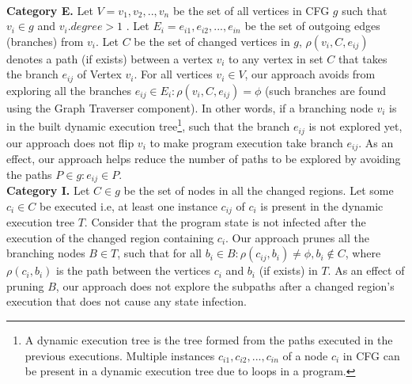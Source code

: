 \\ \textbf{Category E. }Let $V={v_1,v_2,..,v_n}$ be the set of all vertices in CFG $g$ such that $ v_i \in g$ and $v_i.degree >1$ . Let $E_i = {e_{i1}, e_{i2},...,e_{in}}$ be the set of outgoing edges (branches) from $v_i$. Let $C$ be the set of changed vertices in $g$, $\rho(v_i, C, e_{ij})$ denotes a path (if exists) between a vertex $v_i$ to any vertex in set $C$ that takes the branch $e_{ij}$ of Vertex $v_i$.
For all vertices $v_i \in V$, our approach avoids from exploring all the branches $e_{ij}\in E_i : \rho(v_i, C, e_{ij}) = \phi$ (such branches are found using the Graph Traverser component). In other words, if a branching node $v_i$ is in the built dynamic execution tree\footnote{\scriptsize{A dynamic execution tree is the tree formed from the paths executed in the previous executions. Multiple instances $c_{i1}, c_{i2}, ..., c_{in}$ of a node $c_i$ in CFG can be present in a dynamic execution tree due to loops in a program.}}, such that the branch $e_{ij}$ is not explored yet, our approach does not flip $v_i$ to make program execution take branch $e_{ij}$.
As an effect, our approach helps reduce the number of paths to be explored by avoiding the paths $P \in g : e_{ij} \in P$.
\\
\textbf{Category I. }
Let $C \in g$ be the set of nodes in all the changed regions.
Let some $c_i \in C$ be executed i.e, at least one instance $c_{ij}$ of $c_i$ is present in the dynamic execution tree $T$. Consider that the program state is not infected after the execution of the changed region containing $c_i$. Our approach prunes all the branching nodes $B \in T$, such that for all $b_i \in B: \rho(c_{ij}, b_i) \neq \phi, b_i \notin C $, where $\rho(c_i, b_i)$ is the path between the vertices $c_i$ and $b_i$ (if exists) in $T$. As an effect of pruning $B$, our approach does not explore the subpaths after a changed region's execution that does not cause any state infection.
